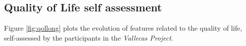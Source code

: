 \documentclass[11pt]{article}
\theoremstyle{definition}
\theoremstyle{remark}
\begin{document}

\subsection{Quality of Life self assessment}
\label{sse:qol}

Figure \ref{fig:qollong} plots the evolution of features related to the quality of life, self-assessed by the participants in the \emph{Vallecas Project}.
\end{document}
